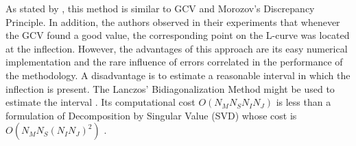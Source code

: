 				As stated by \cite{hansen1993use}, this method is similar to GCV and Morozov's Discrepancy Principle. In addition, the authors observed in their experiments that whenever the GCV found a good value, the corresponding point on the L-curve was located at the inflection. However, the advantages of this approach are its easy numerical implementation and the rare influence of errors correlated in the performance of the methodology. A disadvantage is to estimate a reasonable interval in which the inflection is present. The Lanczos' Bidiagonalization Method might be used to estimate the interval \citep{calvetti2002curve}. Its computational cost $O(N_MN_SN_IN_J)$ is less than a formulation of Decomposition by Singular Value (SVD) whose cost is $O(N_MN_S(N_IN_J)^2)$ \citep{gilmore2009comparison}.
